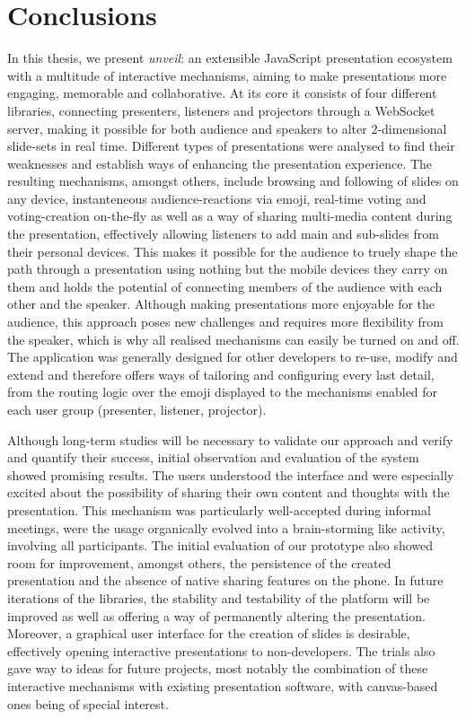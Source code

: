 \chapter{Conclusions}
\label{cha:conclusion}

In this thesis, we present \emph{unveil}: an extensible JavaScript presentation eco\-system with a multitude of interactive mechanisms, aiming to make presentations more engaging, memorable and collaborative. At its core it consists of four different libraries, connecting presenters, listeners and projectors through a WebSocket server, making it possible for both audience and speakers to alter $2$-dimensional slide-sets in real time.
Different types of presentations were analysed to find their weaknesses and establish ways of enhancing the presentation experience. The resulting mechanisms, amongst others, include browsing and following of slides on any device, instanteneous audience-reactions via emoji, real-time voting and voting-creation on-the-fly as well as a way of sharing multi-media content during the presentation, effectively allowing listeners to add main and sub-slides from their personal devices. This makes it possible for the audience to truely shape the path through a presentation using nothing but the mobile devices they carry on them and holds the potential of connecting members of the audience with each other and the speaker. Although making presentations more enjoyable for the audience, this approach poses new challenges and requires more flexibility from the speaker, which is why all realised mechanisms can easily be turned on and off. The application was generally designed for other developers to re-use, modify and extend and therefore offers ways of tailoring and configuring every last detail, from the routing logic over the emoji displayed to the mechanisms enabled for each user group (presenter, listener, projector).

Although long-term studies will be necessary to validate our approach and verify and quantify their success, initial observation and evaluation of the system showed promising results. The users understood the interface and were especially excited about the possibility of sharing their own content and thoughts with the presentation. This mechanism was particularly well-accepted during informal meetings, were the usage organically evolved into a brain-storming like activity, involving all participants. The initial evaluation of our prototype also showed room for improvement, amongst others, the persistence of the created presentation and the absence of native sharing features on the phone. In future iterations of the libraries, the stability and testability of the platform will be improved as well as offering a way of permanently altering the presentation.
Moreover, a graphical user interface for the creation of slides is desirable, effectively opening interactive presentations to non-developers. The trials also gave way to ideas for future projects, most notably the combination of these interactive mechanisms with existing presentation software, with canvas-based ones being of special interest.